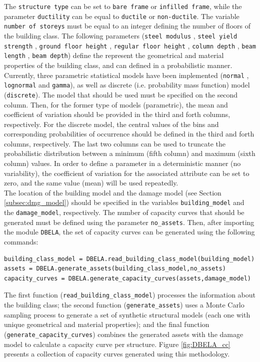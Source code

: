 The \verb=structure type= can be set to \verb=bare frame= or \verb=infilled frame=, while the parameter \verb=ductility= can be equal to \verb=ductile= or \verb=non-ductile=. The variable \verb=number of storeys= must be equal to an integer defining the number of floors of the building class. The following parameters (\verb=steel modulus= , \verb=steel yield strength= , \verb=ground floor height= , \verb=regular floor height= , \verb=column depth= , \verb=beam length= , \verb=beam depth=) define the represent the geometrical and material properties of the building class, and can defined in a probabilistic manner. Currently, three parametric statistical models have been implemented (\verb=normal= , \verb=lognormal= and \verb=gamma=), as well as discrete (i.e. probability mass function) model (\verb=discrete=). The model that should be used must be specified on the second column. Then, for the former type of models (parametric), the mean and coefficient of variation should be provided in the third and forth columns, respectively. For the discrete model, the central values of the bins and corresponding probabilities of occurrence should be defined in the third and forth columns, respectively. The last two columns can be used to truncate the probabilistic distribution between a minimum (fifth column) and maximum (sixth column) values. In order to define a parameter in a deterministic manner (no variability), the coefficient of variation for the associated attribute can be set to zero, and the same value (mean) will be used repeatedly.\\

The location of the building model and the damage model (see Section \ref{subsec:dmg_model}) should be specified in the variables \verb=building_model= and the \verb=damage_model=, respectively. The number of capacity curves that should be generated must be defined using the parameter \verb=no_assets=. Then, after importing the module \verb=DBELA=, the set of capacity curves can be generated using the following commands:

\begin{Verbatim}[frame=single, commandchars=\\\{\}, samepage=true]
building_class_model = DBELA.read_building_class_model(building_model)
assets = DBELA.generate_assets(building_class_model,no_assets)
capacity_curves = DBELA.generate_capacity_curves(assets,damage_model)
\end{Verbatim}

The first function (\verb=read_building_class_model=) processes the information about the building class; the second function (\verb=generate_assets=) uses a Monte Carlo sampling process to generate a set of synthetic structural models (each one with unique geometrical and material properties); and the final function (\verb=generate_capacity_curves=) combines the generated assets with the damage model to calculate a capacity curve per structure. Figure \ref{fig:DBELA_cc} presents a collection of capacity curves generated using this methodology.

